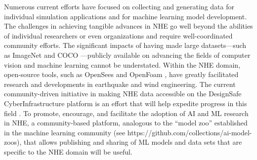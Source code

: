 Numerous current efforts have focused on collecting and generating data for individual simulation applications and for machine learning model development. The challenges in achieving tangible advances in NHE go well beyond the abilities of individual researchers or even organizations and require well-coordinated community efforts. The significant impacts of having made large datasets—such as ImageNet \citep{deng2009imagenet} and COCO \citep{lin2014microsoft}—publicly available on advancing the fields of computer vision and machine learning cannot be understated. Within the NHE domain, open-source tools, such as OpenSees \citep{mckenna2011opensees} and OpenFoam \citep{chen2014openfoam}, have greatly facilitated research and developments in earthquake and wind engineering. The current community-driven initiative in making NHE data accessible on the DesignSafe CyberInfrastructure platform is an effort that will help expedite progress in this field \citep{rathje2017designsafe}. To promote, encourage, and facilitate the adoption of AI and ML research in NHE, a community-based platform, analogous to the ``model zoo'' established in the machine learning community (see https://github.com/collections/ai-model-zoos), that allows publishing and sharing of ML models and data sets that are specific to the NHE domain will be useful. 

